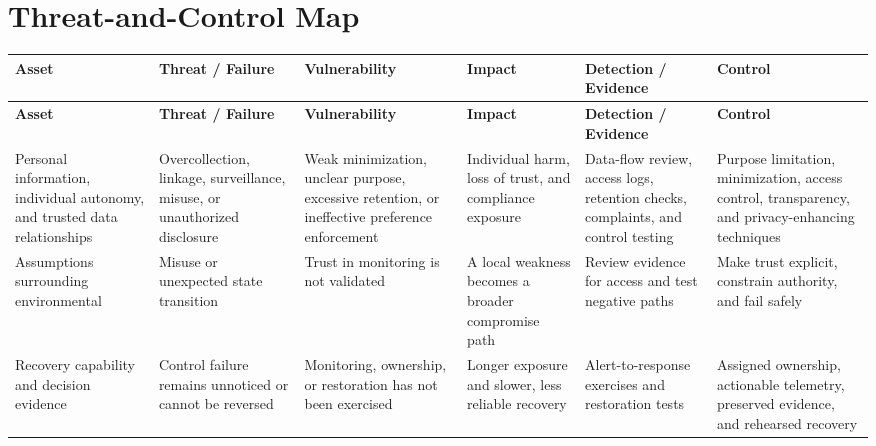 \documentclass[11pt,letterpaper]{article}
\begin{document}
\section*{Threat-and-Control Map}
\begingroup\scriptsize\setlength{\tabcolsep}{2pt}
\begin{longtable}{>{\RaggedRight\arraybackslash}p{}>{\RaggedRight\arraybackslash}p{}>{\RaggedRight\arraybackslash}p{}>{\RaggedRight\arraybackslash}p{}>{\RaggedRight\arraybackslash}p{}>{\RaggedRight\arraybackslash}p{}}
\toprule\rowcolor{Navy}\color{white}\textbf{Asset} & \color{white}\textbf{Threat / Failure} & \color{white}\textbf{Vulnerability} & \color{white}\textbf{Impact} & \color{white}\textbf{Detection / Evidence} & \color{white}\textbf{Control}\\\midrule
\endfirsthead
\toprule\rowcolor{Navy}\color{white}\textbf{Asset} & \color{white}\textbf{Threat / Failure} & \color{white}\textbf{Vulnerability} & \color{white}\textbf{Impact} & \color{white}\textbf{Detection / Evidence} & \color{white}\textbf{Control}\\\midrule
\endhead
Personal information, individual autonomy, and trusted data relationships & Overcollection, linkage, surveillance, misuse, or unauthorized disclosure & Weak minimization, unclear purpose, excessive retention, or ineffective preference enforcement & Individual harm, loss of trust, and compliance exposure & Data-flow review, access logs, retention checks, complaints, and control testing & Purpose limitation, minimization, access control, transparency, and privacy-enhancing techniques\\\midrule
Assumptions surrounding environmental & Misuse or unexpected state transition & Trust in monitoring is not validated & A local weakness becomes a broader compromise path & Review evidence for access and test negative paths & Make trust explicit, constrain authority, and fail safely\\\midrule
Recovery capability and decision evidence & Control failure remains unnoticed or cannot be reversed & Monitoring, ownership, or restoration has not been exercised & Longer exposure and slower, less reliable recovery & Alert-to-response exercises and restoration tests & Assigned ownership, actionable telemetry, preserved evidence, and rehearsed recovery\\\midrule
\bottomrule
\end{longtable}
\endgroup
\end{document}
